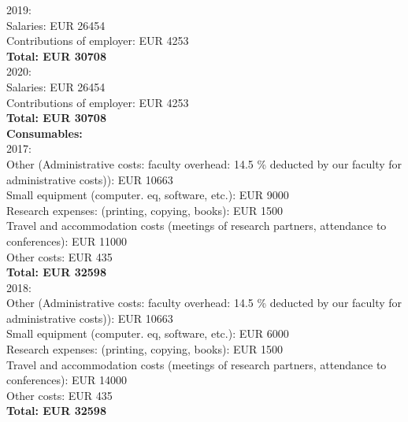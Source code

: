 \documentclass[11pt,dvipsnames,usenames,a4paper]{article}
\begin{document}
2019: \\

Salaries: EUR 26454 \\
Contributions of employer: EUR 4253 \\
{\bf Total: EUR 30708} \\

2020: \\

Salaries: EUR 26454 \\
Contributions of employer: EUR 4253 \\
{\bf Total: EUR 30708} \\


\textbf{Consumables:}\\

2017: \\
Other (Administrative costs: faculty overhead: 14.5 \% deducted by our faculty for administrative costs)): EUR 10663 \\
Small equipment (computer. eq, software, etc.): EUR 9000 \\
Research expenses: (printing, copying, books): EUR 1500 \\
Travel and accommodation costs (meetings of research partners, attendance to conferences): EUR 11000  \\
Other costs: EUR 435 \\
\textbf{Total: EUR 32598} \\

2018: \\
Other (Administrative costs: faculty overhead: 14.5 \% deducted by our faculty for administrative costs)): EUR 10663 \\
Small equipment (computer. eq, software, etc.): EUR 6000 \\
Research expenses: (printing, copying, books): EUR 1500 \\
Travel and accommodation costs (meetings of research partners, attendance to conferences): EUR 14000  \\
Other costs: EUR 435 \\
\textbf{Total: EUR 32598} \\
\end{document}
